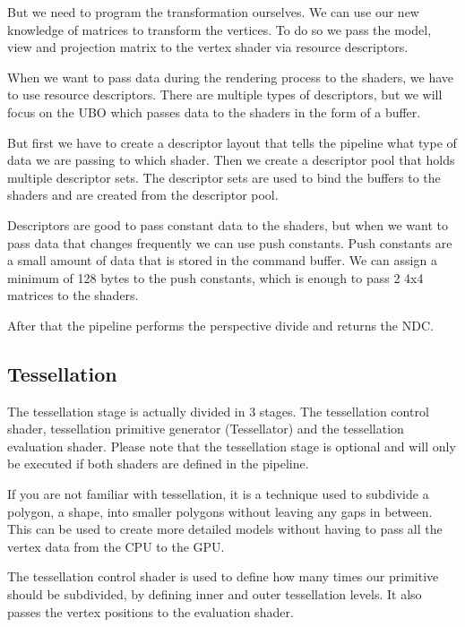 \documentclass[12pt]{report} \usepackage{preamble}
\begin{document}
But we need to program the transformation ourselves. We can use our new
knowledge of matrices to transform the vertices. To do so we pass the
model, view and projection matrix to the vertex shader via resource descriptors.

When we want to pass data during the rendering process to the shaders,
we have to use resource descriptors. There are multiple types of descriptors, but we will
focus on the \ac{UBO} which passes data to the shaders
in the form of a buffer.

But first we have to create a descriptor layout that tells the pipeline
what type of data we are passing to which shader. Then we create a descriptor
pool that holds multiple descriptor sets. The descriptor sets are used to
bind the buffers to the shaders and are created from the descriptor pool. \cite{vulkan-tutorial-descriptors}

Descriptors are good to pass constant data to the shaders, but when we
want to pass data that changes frequently we can use push constants.
Push constants are a small amount of data that is stored in the command
buffer. We can assign a minimum of 128 bytes to the push constants, which
is enough to pass 2 4x4 matrices to the shaders. \cite{push-constants}

After that the pipeline performs the perspective divide and returns the
\ac{NDC}.

\subsection{Tessellation}

The tessellation stage is actually divided in 3 stages. The tessellation
control shader, tessellation primitive generator (Tessellator) and the tessellation
evaluation shader. Please note that the tessellation stage is optional and will
only be executed if both shaders are defined in the pipeline.\cite{tessellation}

If you are not familiar with tessellation, it is a technique used to
subdivide a polygon, a shape, into smaller polygons without leaving
any gaps in between. This can be used to create more detailed models
without having to pass all the vertex data from the \ac{CPU} to the \ac{GPU}. \cite{tessellation}

The tessellation control shader is used to define how many times
our primitive should be subdivided, by defining inner and outer tessellation levels.
It also passes the vertex positions to the evaluation shader. \cite{tessellation}
\end{document}
